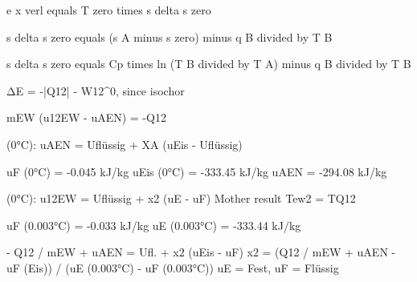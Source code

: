 e x verl equals T zero times s delta s zero

s delta s zero equals (s A minus s zero) minus q B divided by T B

s delta s zero equals Cp times ln (T B divided by T A) minus q B divided by T B

ΔE = -|Q12| - W12^0, since isochor 

mEW (u12EW - uAEN) = -Q12  

(0°C): uAEN = Uflüssig + XA (uEis - Uflüssig)  

uF (0°C) = -0.045 kJ/kg  
uEis (0°C) = -333.45 kJ/kg  
uAEN = -294.08 kJ/kg  

(0°C): u12EW = Uflüssig + x2 (uE - uF)  
Mother result Tew2 = TQ12  

uF (0.003°C) = -0.033 kJ/kg  
uE (0.003°C) = -333.44 kJ/kg  

- Q12 / mEW + uAEN = Ufl. + x2 (uEis - uF)  
x2 = (Q12 / mEW + uAEN - uF (Eis)) / (uE (0.003°C) - uF (0.003°C))  
uE = Fest, uF = Flüssig